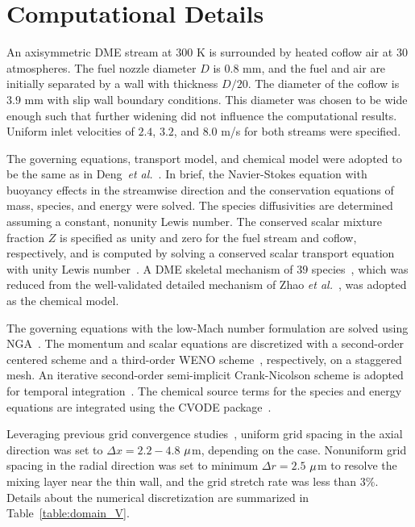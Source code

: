 \documentclass[review,3p,times]{elsarticle}
\begin{document}
 

\section{Computational Details} \label{sec:computation}

An axisymmetric DME stream at $300$ K is surrounded by heated coflow air at $30$ atmospheres.  The fuel nozzle diameter $D$ is $0.8$ mm, and the fuel and air are initially separated by a wall with thickness $D/20$.  The diameter of the coflow is $3.9$ mm with slip wall boundary conditions.  This diameter was chosen to be wide enough such that further widening did not influence the computational results.  Uniform inlet velocities of $2.4$, $3.2$, and $8.0$ m/s for both streams were specified.

The governing equations, transport model, and chemical model were adopted to be the same as in Deng~\emph{et al.}~\cite{deng15}.  In brief, the Navier-Stokes equation with buoyancy effects in the streamwise direction and the conservation equations of mass, species, and energy were solved.  The species diffusivities are determined assuming a constant, nonunity Lewis number.  The conserved scalar mixture fraction $Z$ is specified as unity and zero for the fuel stream and coflow, respectively, and is computed by solving a conserved scalar transport equation with unity Lewis number~\cite{pitsch98b}.  A DME skeletal mechanism of $39$ species~\cite{bhagatwala15}, which was reduced from the well-validated detailed mechanism of Zhao \emph{et al.}~\cite{zhao08}, was adopted as the chemical model.

The governing equations with the low-Mach number formulation are solved using NGA~\cite{desjardins08}.  The momentum and scalar equations are discretized with a second-order centered scheme and a third-order WENO scheme~\cite{liu94}, respectively, on a staggered mesh.  An iterative second-order semi-implicit Crank-Nicolson scheme is adopted for temporal integration~\cite{pierce01}.  The chemical source terms for the species and energy equations are integrated using the CVODE package~\cite{cohen96}.

Leveraging previous grid convergence studies~\cite{deng15}, uniform grid spacing in the axial direction was set to $\Delta x = 2.2-4.8$ ${\rm \mu}$m, depending on the case.  Nonuniform grid spacing in the radial direction was set to minimum $\Delta r = 2.5$ ${\rm \mu}$m to resolve the mixing layer near the thin wall, and the grid stretch rate was less than $3$\%.  Details about the numerical discretization are summarized in Table~\ref{table:domain_V}.      
\end{document}
